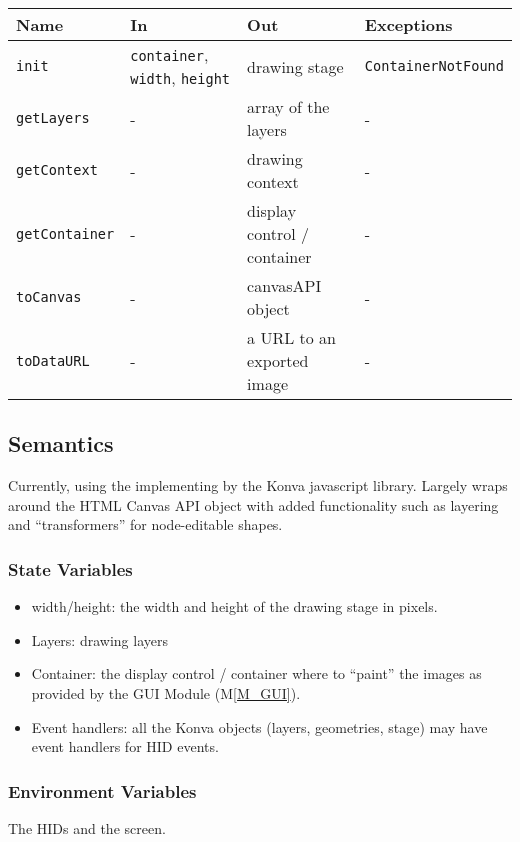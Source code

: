 \documentclass[12pt, titlepage]{article}
\newcommand{\mref}[1]{M\ref{#1}}
\newcommand{\mrefp}[1]{(\mref{#1})}
\newcommand{\mreff}[1]{Module \mrefp{#1}}
\newcommand{\code}[1]{\texttt{#1}}
\begin{document}
\begin{center}
\begin{tabular}{p{2cm} p{5cm} p{4cm} p{4cm}}
\hline
\textbf{Name} & \textbf{In} & \textbf{Out} & \textbf{Exceptions} \\
\hline
\code{init} & \code{container}, \code{width}, \code{height} & drawing stage & \code{ContainerNotFound} \\
\hline
\code{getLayers} & - & array of the layers & - \\
\hline
\code{getContext} & - & drawing context \cite{html_std_canvas} & - \\
\hline
\code{getContainer} & - & display control / container & - \\
\hline
\code{toCanvas} & - & canvasAPI object \cite{html_std_canvas} & - \\
\hline
\code{toDataURL} & - & a URL to an exported image \cite{html_std_canvas} & - \\
\hline
\end{tabular}
\end{center}

\subsection{Semantics}
Currently, using the implementing by the Konva \cite{konva_2021} javascript library.
Largely wraps around the HTML Canvas API object with added functionality such as layering
and ``transformers'' for node-editable shapes.

\subsubsection{State Variables}
\begin{itemize}
  \item width/height: the width and height of the drawing stage in pixels.
  \item Layers: drawing layers
  \item Container: the display control / container where to ``paint'' the images
    as provided by the GUI \mreff{M_GUI}.
  \item Event handlers: all the Konva objects (layers, geometries, stage) may
    have event handlers for HID events.
\end{itemize}

\subsubsection{Environment Variables}
The HIDs and the screen.
\end{document}
